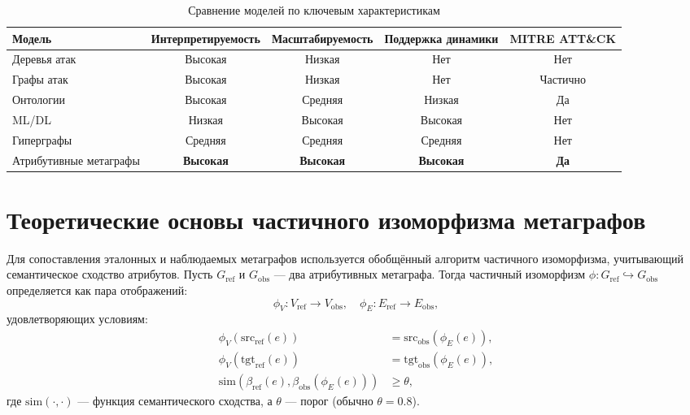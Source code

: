 \documentclass{article}
\begin{document}
\begin{table}[h]
    \centering
    \caption{Сравнение моделей по ключевым характеристикам}
    \label{tab:model_comparison}
    \begin{tabular}{lcccc}
        \toprule
        Модель & Интерпретируемость & Масштабируемость & Поддержка динамики & MITRE ATT\&CK \\
        \midrule
        Деревья атак~\cite{Schneier1999} & Высокая & Низкая & Нет & Нет \\
        Графы атак~\cite{Sheyner2002} & Высокая & Низкая & Нет & Частично \\
        Онтологии~\cite{Jajodia2005} & Высокая & Средняя & Низкая & Да \\
        ML/DL~\cite{Ying2019,Wang2021} & Низкая & Высокая & Высокая & Нет \\
        Гиперграфы~\cite{Berge1989} & Средняя & Средняя & Средняя & Нет \\
        Атрибутивные метаграфы & \textbf{Высокая} & \textbf{Высокая} & \textbf{Высокая} & \textbf{Да} \\
        \bottomrule
    \end{tabular}
\end{table}

\section{Теоретические основы частичного изоморфизма метаграфов}\label{sec:ch2/sec7}

Для сопоставления эталонных и наблюдаемых метаграфов используется обобщённый алгоритм частичного изоморфизма, учитывающий семантическое сходство атрибутов. Пусть $G_{\mathrm{ref}}$ и $G_{\mathrm{obs}}$ — два атрибутивных метаграфа. Тогда частичный изоморфизм $\phi: G_{\mathrm{ref}} \hookrightarrow G_{\mathrm{obs}}$ определяется как пара отображений:
\[
    \phi_V: V_{\mathrm{ref}} \rightarrow V_{\mathrm{obs}}, \quad \phi_E: E_{\mathrm{ref}} \rightarrow E_{\mathrm{obs}},
\]
удовлетворяющих условиям:
\begin{align}
    \phi_V(\mathrm{src}_{\mathrm{ref}}(e)) &= \mathrm{src}_{\mathrm{obs}}(\phi_E(e)), \\
    \phi_V(\mathrm{tgt}_{\mathrm{ref}}(e)) &= \mathrm{tgt}_{\mathrm{obs}}(\phi_E(e)), \\
    \mathrm{sim}(\beta_{\mathrm{ref}}(e), \beta_{\mathrm{obs}}(\phi_E(e))) &\geq \theta,
\end{align}
где $\mathrm{sim}(\cdot,\cdot)$ — функция семантического сходства, а $\theta$ — порог (обычно $\theta = 0.8$).
\end{document}
